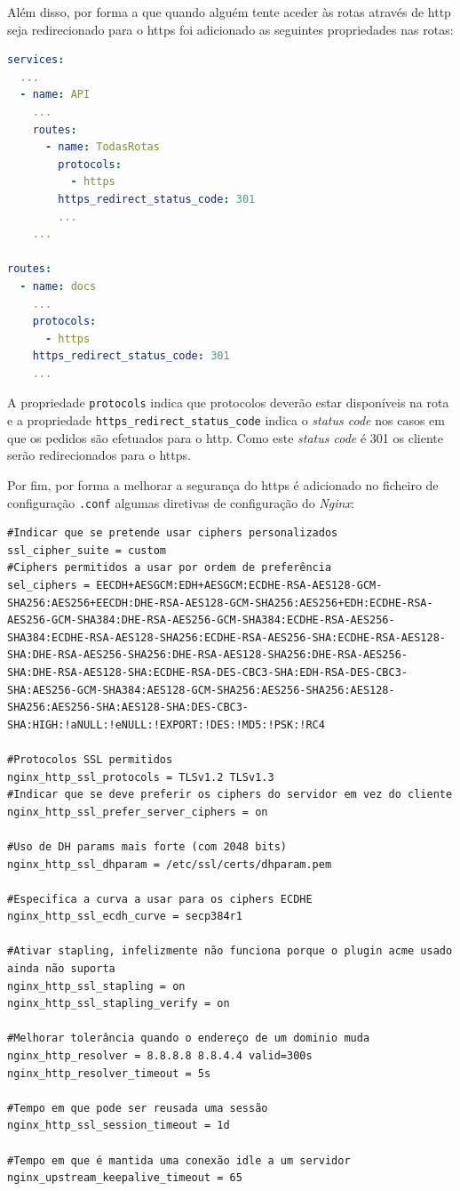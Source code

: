 Além disso, por forma a que quando alguém tente aceder às rotas através de \acrshort{http} seja redirecionado para o \acrshort{https} foi adicionado as seguintes propriedades nas rotas:
\begin{lstlisting}[language=yaml, caption=Configuração declarativa do \textit{Kong}: Serviço para a geração de certificados \acrshort{tls}]
services:
  ...
  - name: API
    ...
    routes:
      - name: TodasRotas
        protocols:
          - https
        https_redirect_status_code: 301
        ...
    ...

routes:
  - name: docs
    ...
    protocols:
      - https
    https_redirect_status_code: 301
    ...
\end{lstlisting}
A propriedade \texttt{protocols} indica que protocolos deverão estar disponíveis na rota e a propriedade \texttt{https\_redirect\_status\_code} indica o \textit{status code} nos casos em que os pedidos são efetuados para o \acrshort{http}. Como este \textit{status code} é 301 os cliente serão redirecionados para o \acrshort{https}.

Por fim, por forma a melhorar a segurança do \acrshort{https} é adicionado no ficheiro de configuração \texttt{.conf} algumas diretivas de configuração do \textit{Nginx}:
\begin{lstlisting}[caption=Configurações do \textit{Nginx} no ficheiro de configuração \texttt{.conf}]
#Indicar que se pretende usar ciphers personalizados
ssl_cipher_suite = custom
#Ciphers permitidos a usar por ordem de preferência
sel_ciphers = EECDH+AESGCM:EDH+AESGCM:ECDHE-RSA-AES128-GCM-SHA256:AES256+EECDH:DHE-RSA-AES128-GCM-SHA256:AES256+EDH:ECDHE-RSA-AES256-GCM-SHA384:DHE-RSA-AES256-GCM-SHA384:ECDHE-RSA-AES256-SHA384:ECDHE-RSA-AES128-SHA256:ECDHE-RSA-AES256-SHA:ECDHE-RSA-AES128-SHA:DHE-RSA-AES256-SHA256:DHE-RSA-AES128-SHA256:DHE-RSA-AES256-SHA:DHE-RSA-AES128-SHA:ECDHE-RSA-DES-CBC3-SHA:EDH-RSA-DES-CBC3-SHA:AES256-GCM-SHA384:AES128-GCM-SHA256:AES256-SHA256:AES128-SHA256:AES256-SHA:AES128-SHA:DES-CBC3-SHA:HIGH:!aNULL:!eNULL:!EXPORT:!DES:!MD5:!PSK:!RC4

#Protocolos SSL permitidos
nginx_http_ssl_protocols = TLSv1.2 TLSv1.3
#Indicar que se deve preferir os ciphers do servidor em vez do cliente
nginx_http_ssl_prefer_server_ciphers = on

#Uso de DH params mais forte (com 2048 bits)
nginx_http_ssl_dhparam = /etc/ssl/certs/dhparam.pem

#Especifica a curva a usar para os ciphers ECDHE
nginx_http_ssl_ecdh_curve = secp384r1

#Ativar stapling, infelizmente não funciona porque o plugin acme usado ainda não suporta
nginx_http_ssl_stapling = on
nginx_http_ssl_stapling_verify = on

#Melhorar tolerância quando o endereço de um dominio muda
nginx_http_resolver = 8.8.8.8 8.8.4.4 valid=300s
nginx_http_resolver_timeout = 5s

#Tempo em que pode ser reusada uma sessão
nginx_http_ssl_session_timeout = 1d

#Tempo em que é mantida uma conexão idle a um servidor
nginx_upstream_keepalive_timeout = 65
\end{lstlisting}

